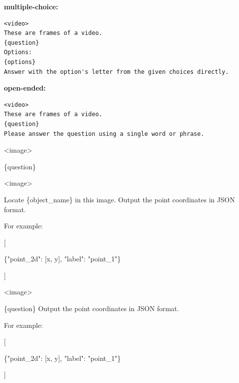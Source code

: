 \begin{tcolorbox}[
  enhanced,
  title=VSI-Bench,
  fonttitle=\bfseries,
  colframe=black,
  colback=white,
  toptitle=1mm,
  bottomtitle=1mm,
  top=1mm,
  bottom=1mm,
  left=1mm,
  right=1mm,
  middle=1mm,
  segmentation style={solid, draw=black, line width=0.4pt}
]
\textbf{multiple-choice:}
\begin{Verbatim}
<video>
These are frames of a video.
{question}
Options:
{options}
Answer with the option's letter from the given choices directly.
\end{Verbatim}

\tcblower

\textbf{open-ended:}
\begin{Verbatim}
<video>
These are frames of a video.
{question}
Please answer the question using a single word or phrase.
\end{Verbatim}
\end{tcolorbox}

\begin{tcolorbox}[
  title=EmbSpatialBench,
  fonttitle=\bfseries,
  colframe=black,
  colback=white,
  toptitle=1mm,
  bottomtitle=1mm,
  top=2mm,
  verbatim,
]
<image>

\{question\}
\end{tcolorbox}

\begin{tcolorbox}[
  title=RoboSpatialHome,
  fonttitle=\bfseries,
  colframe=black,
  colback=white,
  toptitle=1mm,
  bottomtitle=1mm,
  top=2mm,
  verbatim,
]
<image>

Locate \{object\_name\} in this image. Output the point coordinates in JSON format.

For example:


[

    \{"point\_2d": [x, y], "label": "point\_1"\}
    
]
\end{tcolorbox}

\begin{tcolorbox}[
  title=RefSpatialBench,
  fonttitle=\bfseries,
  colframe=black,
  colback=white,
  toptitle=1mm,
  bottomtitle=1mm,
  top=2mm,
  verbatim,
]
<image>

\{question\} Output the point coordinates in JSON format.

For example:


[

     \{"point\_2d": [x, y], "label": "point\_1"\}
     
]
\end{tcolorbox}

